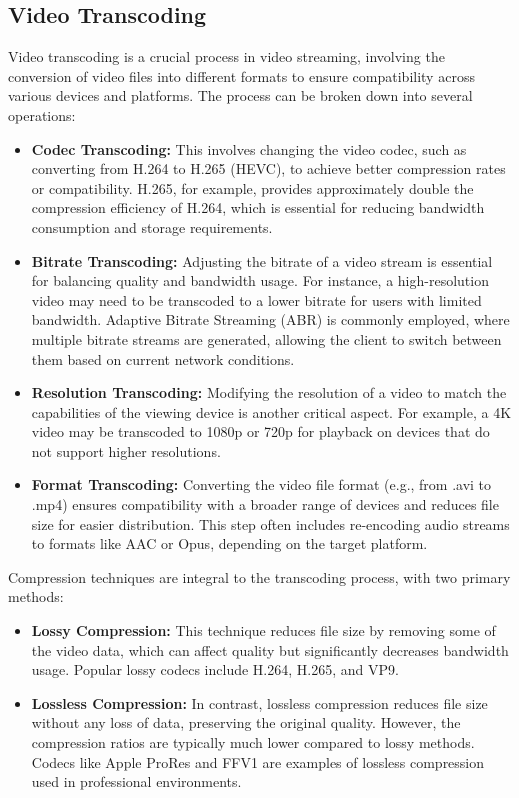 \subsection{Video Transcoding}
Video transcoding is a crucial process in video streaming, involving the conversion of video files into different formats to ensure compatibility across various devices and platforms. The process can be broken down into several operations:

\begin{itemize}
    \item \textbf{Codec Transcoding:} This involves changing the video codec, such as converting from H.264 to H.265 (HEVC), to achieve better compression rates or compatibility. H.265, for example, provides approximately double the compression efficiency of H.264, which is essential for reducing bandwidth consumption and storage requirements\cite{codec_transcoding}.
    \item \textbf{Bitrate Transcoding:} Adjusting the bitrate of a video stream is essential for balancing quality and bandwidth usage. For instance, a high-resolution video may need to be transcoded to a lower bitrate for users with limited bandwidth. Adaptive Bitrate Streaming (ABR) is commonly employed, where multiple bitrate streams are generated, allowing the client to switch between them based on current network conditions\cite{bitrate_transcoding}.
    \item \textbf{Resolution Transcoding:} Modifying the resolution of a video to match the capabilities of the viewing device is another critical aspect. For example, a 4K video may be transcoded to 1080p or 720p for playback on devices that do not support higher resolutions\cite{resolution_transcoding}.
    \item \textbf{Format Transcoding:} Converting the video file format (e.g., from .avi to .mp4) ensures compatibility with a broader range of devices and reduces file size for easier distribution. This step often includes re-encoding audio streams to formats like AAC or Opus, depending on the target platform\cite{format_transcoding}.
\end{itemize}

Compression techniques are integral to the transcoding process, with two primary methods:

\begin{itemize}
    \item \textbf{Lossy Compression:} This technique reduces file size by removing some of the video data, which can affect quality but significantly decreases bandwidth usage. Popular lossy codecs include H.264, H.265, and VP9\cite{lossy_compression}.
    \item \textbf{Lossless Compression:} In contrast, lossless compression reduces file size without any loss of data, preserving the original quality. However, the compression ratios are typically much lower compared to lossy methods. Codecs like Apple ProRes and FFV1 are examples of lossless compression used in professional environments\cite{lossless_compression}.
\end{itemize}

